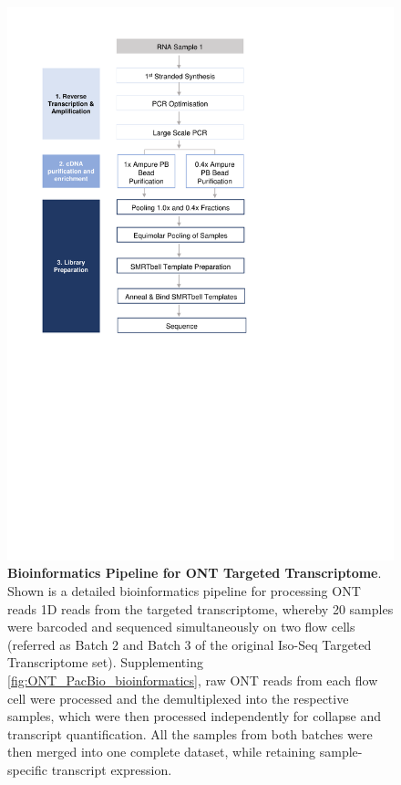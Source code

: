 \begin{figure}[htp]
	\centering
	\includegraphics[page=16,trim={0cm 8cm 0cm 0cm},clip,scale = 0.8]{Figures/ProjectDevelopment_Figures}
	\captionsetup{width=0.95\textwidth,singlelinecheck=off}
	\caption[Bioinformatics Pipeline for ONT Targeted Transcriptome]%
	{\textbf{Bioinformatics Pipeline for ONT Targeted Transcriptome}. Shown is a detailed bioinformatics pipeline for processing ONT reads 1D reads from the targeted transcriptome, whereby 20 samples were barcoded and sequenced simultaneously on two flow cells (referred as Batch 2 and Batch 3 of the original Iso-Seq Targeted Transcriptome set). Supplementing \cref{fig:ONT_PacBio_bioinformatics}, raw ONT reads from each flow cell were processed and the demultiplexed into the respective samples, which were then processed independently for collapse and transcript quantification. All the samples from both batches were then merged into one complete dataset, while retaining sample-specific transcript expression. 
	}
	\label{fig:ONT_Targeted_bioinformatics}
\end{figure}



